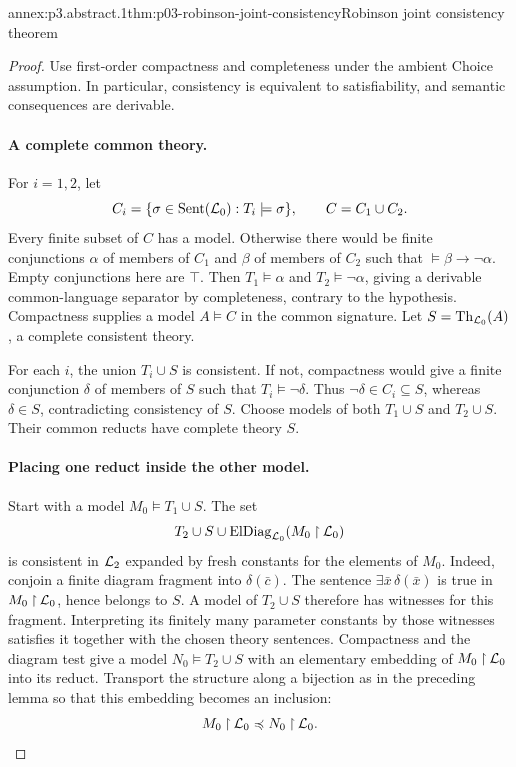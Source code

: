 \begin{annexitem}{annex:p3.abstract.1}{thm:p03-robinson-joint-consistency}{Robinson joint consistency theorem}
\begin{proof}
Use first-order compactness and completeness under the ambient Choice
assumption.  In particular, consistency is equivalent to satisfiability,
and semantic consequences are derivable.

\paragraph{A complete common theory.}
For \(i=1,2\), let
\[
 C_i=\{\sigma\in\operatorname{Sent}(\mathcal{L}_0):T_i\models\sigma\},
 \qquad C=C_1\cup C_2.
\]
Every finite subset of \(C\) has a model.
Otherwise there would be finite conjunctions \(\alpha\) of members
of \(C_1\) and \(\beta\) of members of \(C_2\) such that
\(\models\beta\to\neg\alpha\).
Empty conjunctions here are \(\top\).
Then \(T_1\models\alpha\) and \(T_2\models\neg\alpha\), giving a
derivable common-language separator by completeness, contrary to
the hypothesis.
Compactness supplies a model \(A\models C\) in the common signature.
Let \(S=\operatorname{Th}_{\mathcal{L}_0}(A)\), a complete consistent theory.

For each \(i\), the union \(T_i\cup S\) is consistent.
If not, compactness would give a finite conjunction \(\delta\) of
members of \(S\) such that \(T_i\models\neg\delta\).
Thus \(\neg\delta\in C_i\subseteq S\), whereas \(\delta\in S\),
contradicting consistency of \(S\).
Choose models of both \(T_1\cup S\) and \(T_2\cup S\).
Their common reducts have complete theory \(S\).

\paragraph{Placing one reduct inside the other model.}
Start with a model \(M_0\models T_1\cup S\).
The set
\[
 T_2\cup S\cup
       \operatorname{ElDiag}_{\mathcal{L}_0}(M_0\mathbin{\upharpoonright}\mathcal{L}_0)
\]
is consistent in \(\mathcal{L}_2\) expanded by fresh constants for the
elements of \(M_0\).
Indeed, conjoin a finite diagram fragment into \(\delta(\bar c)\).
The sentence \(\exists\bar x\,\delta(\bar x)\) is true in
\(M_0\mathbin{\upharpoonright}\mathcal{L}_0\), hence belongs to \(S\).
A model of \(T_2\cup S\) therefore has witnesses for this fragment.
Interpreting its finitely many parameter constants by those witnesses
satisfies it together with the chosen theory sentences.
Compactness and the diagram test give a model \(N_0\models T_2\cup S\)
with an elementary embedding of \(M_0\mathbin{\upharpoonright}\mathcal{L}_0\) into its reduct.
Transport the structure along a bijection as in the preceding lemma
so that this embedding becomes an inclusion:
\[
 M_0\mathbin{\upharpoonright}\mathcal{L}_0\preccurlyeq N_0\mathbin{\upharpoonright}\mathcal{L}_0.
\]


\end{proof}
\end{annexitem}
